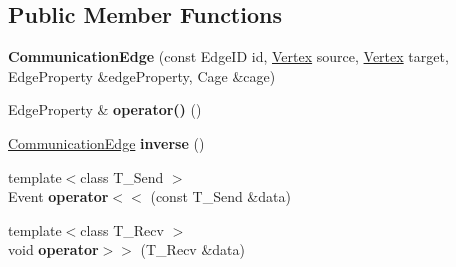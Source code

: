 \subsection*{Public Member Functions}
\begin{DoxyCompactItemize}
\item 
\hypertarget{structgraybat_1_1CommunicationEdge_a37414bfe7af9097e8ffff9da90fc4226}{}{\bfseries Communication\+Edge} (const Edge\+I\+D id, \hyperlink{structgraybat_1_1CommunicationVertex}{Vertex} source, \hyperlink{structgraybat_1_1CommunicationVertex}{Vertex} target, Edge\+Property \&edge\+Property, Cage \&cage)\label{structgraybat_1_1CommunicationEdge_a37414bfe7af9097e8ffff9da90fc4226}

\item 
\hypertarget{structgraybat_1_1CommunicationEdge_a3a35ef247309c903341a14d207c85f78}{}Edge\+Property \& {\bfseries operator()} ()\label{structgraybat_1_1CommunicationEdge_a3a35ef247309c903341a14d207c85f78}

\item 
\hypertarget{structgraybat_1_1CommunicationEdge_a9fe34dbcec8a1588385c7591fa5ae042}{}\hyperlink{structgraybat_1_1CommunicationEdge}{Communication\+Edge} {\bfseries inverse} ()\label{structgraybat_1_1CommunicationEdge_a9fe34dbcec8a1588385c7591fa5ae042}

\item 
\hypertarget{structgraybat_1_1CommunicationEdge_a6d3bbea5aede74ddb7b8082ed7055c2a}{}{\footnotesize template$<$class T\+\_\+\+Send $>$ }\\Event {\bfseries operator$<$$<$} (const T\+\_\+\+Send \&data)\label{structgraybat_1_1CommunicationEdge_a6d3bbea5aede74ddb7b8082ed7055c2a}

\item 
\hypertarget{structgraybat_1_1CommunicationEdge_a595c4400fd5d837dab1bf8af4f172e5d}{}{\footnotesize template$<$class T\+\_\+\+Recv $>$ }\\void {\bfseries operator$>$$>$} (T\+\_\+\+Recv \&data)\label{structgraybat_1_1CommunicationEdge_a595c4400fd5d837dab1bf8af4f172e5d}

\end{DoxyCompactItemize}
